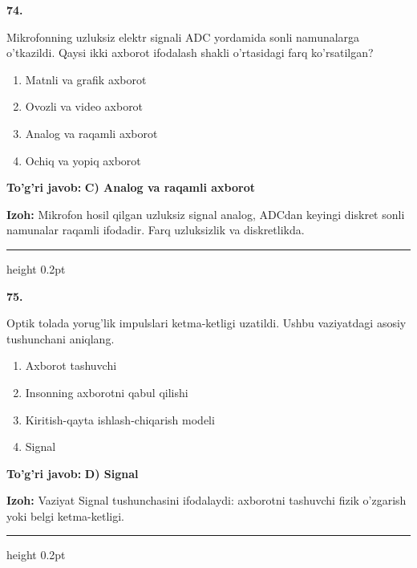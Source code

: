 \documentclass[10pt,a4paper,oneside]{article}
\begin{document}
\noindent\textbf{\color{ink}74.}
\par
Mikrofonning uzluksiz elektr signali ADC yordamida sonli namunalarga o'tkazildi. Qaysi ikki axborot ifodalash shakli o'rtasidagi farq ko'rsatilgan?
\begin{enumerate}[label=\Alph*),leftmargin=9mm]
\item Matnli va grafik axborot
\item Ovozli va video axborot
\item Analog va raqamli axborot
\item Ochiq va yopiq axborot
\end{enumerate}
\begin{tcolorbox}[enhanced,breakable,colback=teal!4,colframe=teal!50!black,boxrule=0.5pt,arc=1.1mm,left=3mm,right=3mm,top=1.7mm,bottom=1.7mm,before skip=2mm,after skip=2mm]
\textbf{\color{teal}To'g'ri javob:} \textbf{C) Analog va raqamli axborot}
\par\smallskip
\textbf{Izoh:} Mikrofon hosil qilgan uzluksiz signal analog, ADCdan keyingi diskret sonli namunalar raqamli ifodadir. Farq uzluksizlik va diskretlikda.
\end{tcolorbox}
\vspace{2mm}\hrule height 0.2pt \vspace{3mm}

\noindent\textbf{\color{ink}75.}
\par
Optik tolada yorug'lik impulslari ketma-ketligi uzatildi. Ushbu vaziyatdagi asosiy tushunchani aniqlang.
\begin{enumerate}[label=\Alph*),leftmargin=9mm]
\item Axborot tashuvchi
\item Insonning axborotni qabul qilishi
\item Kiritish-qayta ishlash-chiqarish modeli
\item Signal
\end{enumerate}
\begin{tcolorbox}[enhanced,breakable,colback=teal!4,colframe=teal!50!black,boxrule=0.5pt,arc=1.1mm,left=3mm,right=3mm,top=1.7mm,bottom=1.7mm,before skip=2mm,after skip=2mm]
\textbf{\color{teal}To'g'ri javob:} \textbf{D) Signal}
\par\smallskip
\textbf{Izoh:} Vaziyat Signal tushunchasini ifodalaydi: axborotni tashuvchi fizik o'zgarish yoki belgi ketma-ketligi.
\end{tcolorbox}
\vspace{2mm}\hrule height 0.2pt \vspace{3mm}
\end{document}
